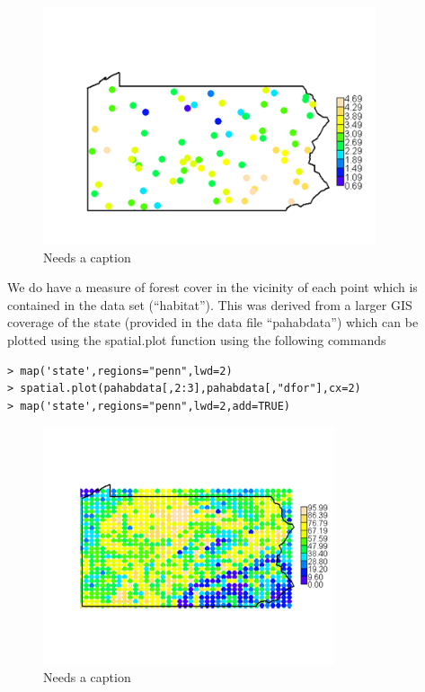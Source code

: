 \begin{figure}
\begin{center}
\includegraphics[height=2.75in]{figs/PA1}
\end{center}
\caption{Needs a caption}
\label{fig.PA1}
\end{figure}

We do have a measure of forest cover in the vicinity of each point which is contained in the data set (``habitat''). This was derived from a larger GIS coverage of the state (provided in the data file ``pahabdata'') which can be plotted using the spatial.plot function using the following commands
\begin{verbatim}
> map('state',regions="penn",lwd=2)
> spatial.plot(pahabdata[,2:3],pahabdata[,"dfor"],cx=2)
> map('state',regions="penn",lwd=2,add=TRUE)
\end{verbatim}


\begin{figure}
\begin{center}
\includegraphics[height=2.75in]{figs/PA2}
\end{center}
\caption{Needs a caption}
\label{fig.PA21}
\end{figure}


